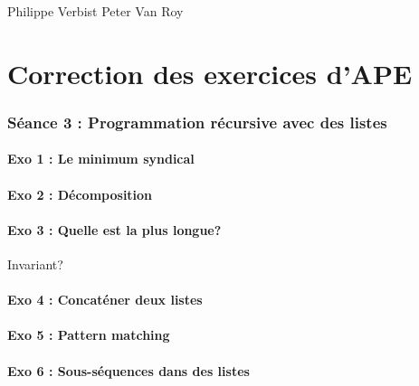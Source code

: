 

\DeclareMathOperator{\pgcd}{PGCD}

{Philippe Verbist}
{Peter Van Roy}


\newcommand{\st}{\mathrm{ST}}
\newcommand{\ce}{\mathrm{CE}}
\newcommand{\mozart}{Mozart}





\newpage
\part{Correction des exercices d'APE}
\section{Séance 3 : Programmation récursive avec des listes}

\subsection{Exo 1 : Le minimum syndical}


\subsection{Exo 2 : Décomposition}


\subsection{Exo 3 : Quelle est la plus longue?}

Invariant?

\subsection{Exo 4 : Concaténer deux listes}


\subsection{Exo 5 : Pattern matching}


\subsection{Exo 6 : Sous-séquences dans des listes}


